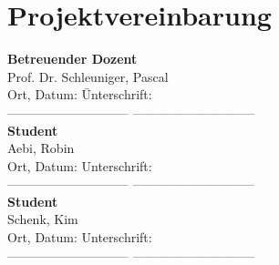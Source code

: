 \clearpage
\section{Projektvereinbarung}\label{sec:Projektvereinbarung}
	\begin{tabbing}
		\textbf{Betreuender Dozent}\\[0.2cm]
		Prof. Dr. Schleuniger, Pascal \\[0.2cm]
		Ort, Datum: \hspace{5cm}\=Unterschrift:
		\\[0.5cm]----------------------------- \>-----------------------------
		\\[0.5cm]
		\textbf{Student}\\[0.2cm]
		Aebi, Robin\\[0.2cm]
		Ort, Datum: \>Unterschrift:
		\\[0.5cm]----------------------------- \>-----------------------------
		\\[0.5cm]
		\textbf{Student}\\[0.2cm]
		Schenk, Kim\\[0.2cm]
		Ort, Datum: \>Unterschrift:
		\\[0.5cm]----------------------------- \>-----------------------------
	\end{tabbing}
	
	\clearpage



